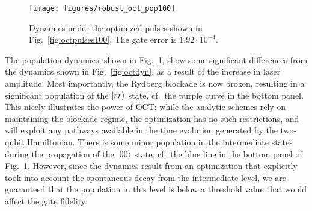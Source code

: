 \begin{figure}[tb]
  \centering
  \texttt{[image: figures/robust\_oct\_pop100]}
  \caption{%
  Dynamics under the optimized pulses shown in
  Fig.~\ref{fig:octpulses100}. The gate error is $1.92\cdot10^{-4}$.}
  \label{fig:octdyn100}
\end{figure}
The population dynamics, shown in Fig.~\ref{fig:octdyn100}, show some
significant differences from the 
dynamics shown in Fig.~\ref{fig:octdyn}, as a result of the increase
in laser amplitude. 
Most importantly, the Rydberg blockade
is now broken, resulting in a significant population of the $\Ket{rr}$ state,
cf.\ the purple curve in the bottom panel. This nicely illustrates the power of
OCT; while the analytic schemes rely on maintaining the blockade regime, the
optimization has no such restrictions, and will exploit any pathways available
in the time evolution generated by the two-qubit Hamiltonian.
There is some minor population in the intermediate
states during the propagation of the $\Ket{00}$ state, cf.\ the blue line in the
bottom panel of Fig.~\ref{fig:octdyn100}. However, since the dynamics result
from an optimization that  explicitly took into account the spontaneous decay from the
intermediate level, we are guaranteed that the population in this
level is below a threshold value that would affect the gate fidelity.

